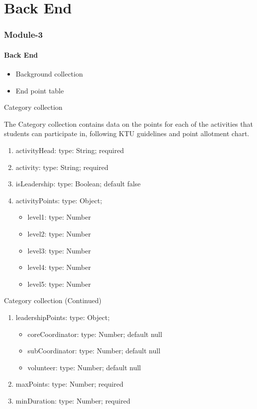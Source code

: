 
\section{Back End}

\begin{frame}

 \frametitle{\centering Module-3}


  \framesubtitle{Back End}
  \begin{itemize}
   \item Background collection 
    \item End point table
  \end{itemize}
\end{frame}

\begin{frame}{Category collection}

The Category collection contains data on the points for each of the activities that students can participate in, following KTU guidelines and point allotment chart.

\begin{enumerate}
    \item activityHead: {type: String}; required
    \item activity: {type: String}; required
    \item isLeadership: {type: Boolean}; default false
    \item activityPoints: {type: Object};
    \begin{itemize}
        \item level1: {type: Number}
        \item level2: {type: Number}
        \item level3: {type: Number}
        \item level4: {type: Number}
        \item level5: {type: Number}
    \end{itemize}
\end{enumerate}

\end{frame}

\begin{frame}{Category collection (Continued)}
\begin{enumerate}[resume]
    \item leadershipPoints: {type: Object};
    \begin{itemize}
        \item coreCoordinator: {type: Number}; default null
        \item subCoordinator: {type: Number}; default null
        \item volunteer: {type: Number}; default null
    \end{itemize}
    \item maxPoints: {type: Number}; required
    \item minDuration: {type: Number}; required
\end{enumerate}

\end{frame}


